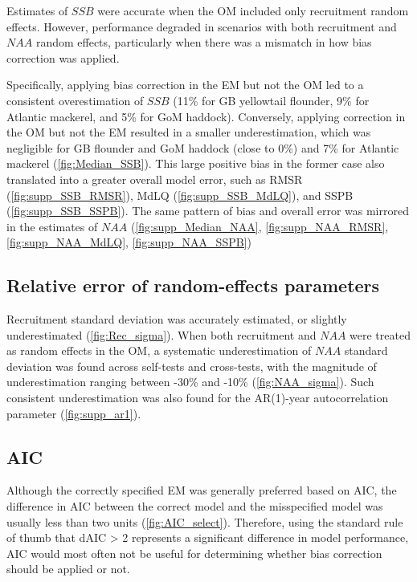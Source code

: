 \documentclass[
  12pt,
]{article}
\begin{document}
Estimates of \(SSB\) were accurate when the OM included only recruitment
random effects. However, performance degraded in scenarios with both
recruitment and \(NAA\) random effects, particularly when there was a
mismatch in how bias correction was applied.

Specifically, applying bias correction in the EM but not the OM led to a
consistent overestimation of \(SSB\) (11\% for GB yellowtail flounder,
9\% for Atlantic mackerel, and 5\% for GoM haddock). Conversely,
applying correction in the OM but not the EM resulted in a smaller
underestimation, which was negligible for GB flounder and GoM haddock
(close to 0\%) and 7\% for Atlantic mackerel (\autoref{fig:Median_SSB}).
This large positive bias in the former case also translated into a
greater overall model error, such as RMSR (\autoref{fig:supp_SSB_RMSR}),
MdLQ (\autoref{fig:supp_SSB_MdLQ}), and SSPB
(\autoref{fig:supp_SSB_SSPB}). The same pattern of bias and overall
error was mirrored in the estimates of \(NAA\)
(\autoref{fig:supp_Median_NAA}, \autoref{fig:supp_NAA_RMSR},
\autoref{fig:supp_NAA_MdLQ}, \autoref{fig:supp_NAA_SSPB})

\hypertarget{relative-error-of-random-effects-parameters}{%
\subsection{Relative error of random-effects
parameters}\label{relative-error-of-random-effects-parameters}}

Recruitment standard deviation was accurately estimated, or slightly
underestimated (\autoref{fig:Rec_sigma}). When both recruitment and
\(NAA\) were treated as random effects in the OM, a systematic
underestimation of \(NAA\) standard deviation was found across
self-tests and cross-tests, with the magnitude of underestimation
ranging between -30\% and -10\% (\autoref{fig:NAA_sigma}). Such
consistent underestimation was also found for the AR(1)-year
autocorrelation parameter (\autoref{fig:supp_ar1}).

\hypertarget{aic}{%
\subsection{AIC}\label{aic}}

Although the correctly specified EM was generally preferred based on
AIC, the difference in AIC between the correct model and the
misspecified model was usually less than two units
(\autoref{fig:AIC_select}). Therefore, using the standard rule of thumb
that dAIC \textgreater{} 2 represents a significant difference in model
performance, AIC would most often not be useful for determining whether
bias correction should be applied or not.
\end{document}
